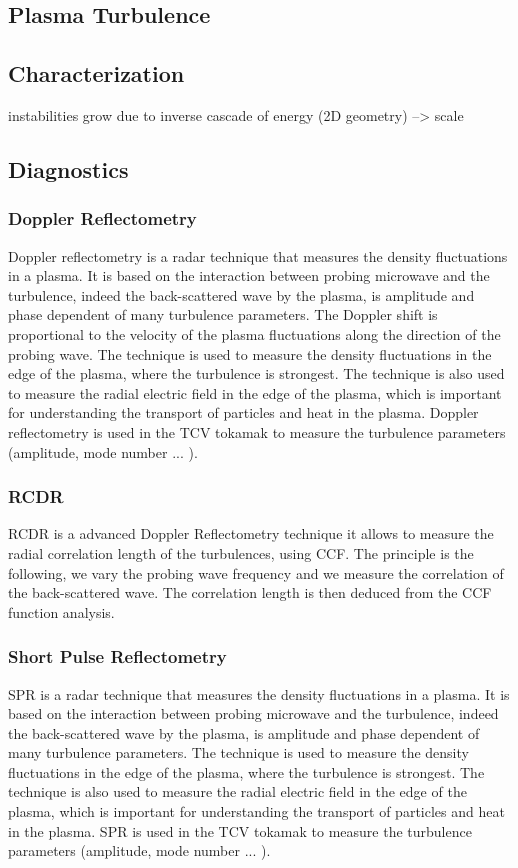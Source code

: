 \documentclass[11pt,a4paper]{report}
\begin{document}
\begin{multicols}{2}
    \section{{Plasma Turbulence}}
    \subsection{Characterization}
    instabilities grow due to inverse cascade of energy (2D geometry) --> scale
    \subsection{Diagnostics}
    \subsubsection{Doppler Reflectometry}
    Doppler reflectometry is a radar technique that measures the density fluctuations in a plasma. It is based on the interaction between probing microwave  and the turbulence, indeed the back-scattered wave by the plasma, is amplitude and phase dependent of many turbulence parameters. The Doppler shift is proportional to the velocity of the plasma fluctuations along the direction of the probing wave. The technique is used to measure the density fluctuations in the edge of the plasma, where the turbulence is strongest. The technique is also used to measure the radial electric field in the edge of the plasma, which is important for understanding the transport of particles and heat in the plasma. Doppler reflectometry is used in the TCV tokamak to measure the turbulence parameters (amplitude, mode number ... ).

    \subsubsection{RCDR}
    RCDR is a advanced Doppler Reflectometry technique it allows to measure the radial correlation length of the turbulences, using CCF. The principle is the following, we vary the probing wave frequency and we measure the correlation of the back-scattered wave. The correlation length is then deduced from the CCF function analysis.

    \subsubsection{Short Pulse Reflectometry}
    SPR is a radar technique that measures the density fluctuations in a plasma. It is based on the interaction between probing microwave  and the turbulence, indeed the back-scattered wave by the plasma, is amplitude and phase dependent of many turbulence parameters. The technique is used to measure the density fluctuations in the edge of the plasma, where the turbulence is strongest. The technique is also used to measure the radial electric field in the edge of the plasma, which is important for understanding the transport of particles and heat in the plasma. SPR is used in the TCV tokamak to measure the turbulence parameters (amplitude, mode number ... ).

\end{multicols}
\end{document}
